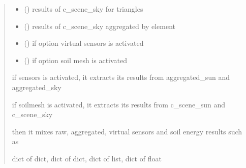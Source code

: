 \documentclass[letterpaper,10pt,english]{sphinxmanual}
\begin{document}
\begin{fulllineitems}
\begin{quote}
\begin{description}
\begin{itemize}
\item {} 
\sphinxAtStartPar
{} () \textendash{} results of c\_scene\_sky for triangles

\item {} 
\sphinxAtStartPar
{} () \textendash{} results of c\_scene\_sky aggregated by element

\item {} 
\sphinxAtStartPar
{} () \textendash{} if option virtual sensors is activated

\item {} 
\sphinxAtStartPar
{} () \textendash{} if option soil mesh is activated

\end{itemize}

\sphinxAtStartPar

\sphinxAtStartPar
if sensors is activated, it extracts its results from aggregated\_sun and aggregated\_sky

\sphinxAtStartPar
if soilmesh is activated, it extracts its results from c\_scene\_sun and c\_scene\_sky

\sphinxAtStartPar
then it mixes raw, aggregated, virtual sensors and soil energy results such as

\sphinxAtStartPar
{}


\sphinxAtStartPar
dict of dict, dict of dict, dict of list, dict of float

\end{description}\end{quote}

\end{fulllineitems}

\end{document}
